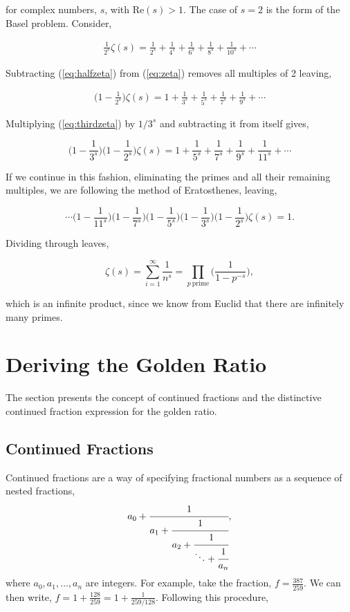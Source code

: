 \documentclass[11pt]{amsart}
\begin{document}
for complex numbers, $s$, with $\text{Re}(s) > 1$. The case of $s = 2$ is the form of the Basel problem. Consider,

\begin{align}\frac{1}{2^s}\zeta(s) = \frac{1}{2^s} + \frac{1}{4^s} + \frac{1}{6^s} + \frac{1}{8^s} + \frac{1}{10^s} + \cdots \label{eq:halfzeta}
\end{align}

Subtracting (\ref{eq:halfzeta}) from (\ref{eq:zeta}) removes all multiples of 2 leaving,

\begin{align}\Big(1 - \frac{1}{2^s}\Big)\zeta(s) = 1 + \frac{1}{3^s} + \frac{1}{5^s} + \frac{1}{7^s} + \frac{1}{9^s} + \cdots \label{eq:thirdzeta}
\end{align}

Multiplying (\ref{eq:thirdzeta}) by $1/3^s$ and subtracting it from itself gives,

$$\Big(1 - \frac{1}{3^s}\Big)\Big(1 - \frac{1}{2^s}\Big)\zeta(s) = 1 + \frac{1}{5^s} + \frac{1}{7^s} + \frac{1}{9^s} + \frac{1}{11^s} + \cdots$$

If we continue in this fashion, eliminating the primes and all their remaining multiples, we are following the method of Eratosthenes, leaving,

$$
\cdots\Big(1 - \frac{1}{11^s}\Big)\Big(1 - \frac{1}{7^s}\Big)\Big(1 - \frac{1}{5^s}\Big)\Big(1 - \frac{1}{3^s}\Big)\Big(1 - \frac{1}{2^s}\Big)\zeta(s) = 1.
$$

Dividing through leaves,

$$\zeta(s) = \sum_{i=1}^{\infty}\frac{1}{n^s} = \prod_{p \ \text{prime}}\Bigg(\frac{1}{1 - p^{-s}}\Bigg),$$

which is an infinite product, since we know from Euclid that there are infinitely many primes.

\section{Deriving the Golden Ratio}

The section presents the concept of continued fractions and the distinctive continued fraction expression for the golden ratio.

\subsection{Continued Fractions}
Continued fractions are a way of specifying fractional numbers as a sequence of nested fractions,
$$a_0 + \cfrac{1}{a_1 + \cfrac{1}{a_2 + \cfrac{1}{\ddots + \cfrac{1}{a_n}}}},$$
where $a_0, a_1, \dots, a_n$ are integers. For example, take the fraction, $ f = \frac{387}{259}$. We can then write, $f = 1 + \frac{128}{259} = 1 + \frac{1}{259/128}$. Following this procedure,
\end{document}

